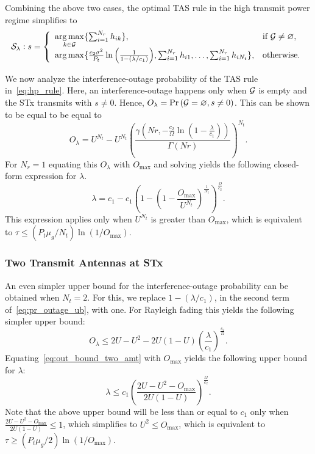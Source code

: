\documentclass[12pt,draftcls,peerreview,onecolumn]{IEEEtran}
\newcommand{\brac}[1]{\left({#1}\right)}
\newcommand{\prob}[1]{\text{Pr}\brac{#1}}
\DeclareMathOperator*{\argmax}{arg\,max}
\newcommand{\nx}{{0}}
\newcommand{\lam}{\lambda}
\newcommand{\mug}{{\mu_{g}}}
\newcommand{\goodset}{\cal{G}}
\newcommand{\Nt}{{N_t}}
\newcommand{\Nr}{{N_r}}
\newcommand{\Pt}{{P_t}}
\newcommand{\such}{h}
\newcommand{\hk}[1]{{\such_{#1}}}
\newcommand{\noisevar}{\sigma^2}
\newcommand{\outmax}{O_{\text{max}}}
\newcommand{\itau}{\tau}
\newcommand{\cone}{c_{1}}
\newcommand{\ctwo}{c_{2}}
\newcommand{\out}{O}
\newcommand{\m}{\cone}
\newcommand{\lambym}{\frac{\lam}{\m}}
\newcommand{\al}{\ctwo}
\newcommand{\snr}{\Omega}
\newcommand{\albysnr}[1][]{\frac{\al#1}{\snr}}
\newcommand{\snrbyal}[1][]{\frac{\snr#1}{\al}}
\newcommand{\un}{U}
\newcommand{\igamma}{{\frac{\al\noisevar}{\Pt}\ln\left(\frac{1}{1-\left(\lam/\m\right) }\right)}}
\newcommand{\callamrule}{{\cal S_{{\lam}}}}
\newcommand{\outlam}{\out_{\lam}}
\newcommand{\nullset}{\varnothing}
\begin{document}
Combining the above two cases, the optimal TAS rule in the high transmit power regime simplifies to
\begin{equation}
\label{eq:hp_rule}
\callamrule: s = \left\{
 \begin{array}{ll}
\argmax\limits_{k\in\goodset}\{\sumnr \hk{ik}\}, & \text{if}~\goodset\neq\nullset, \\
\argmax\{\igamma,\sumnr\hk{i1},\dots,\sumnr\hk{i\Nt}\}, &\text{otherwise}.
\end{array}\right.
\end{equation}

We now analyze the interference-outage probability of the TAS rule in~\eqref{eq:hp_rule}. Here, an interference-outage happens only when $\goodset$ is empty and the STx  transmits with $s\neq\nx$. Hence,  $\outlam=\prob{{\goodset}=\nullset, s \neq 0}$. This can be shown to be equal to be equal to
\begin{equation}
\label{eq:pr_outage_hp}
 \outlam = \un^{\Nt} - \un^{\Nt}\left( \frac{\gamma\left(Nr,-\albysnr[]\ln\left(1-\lambym\right)\right)}{\Gamma\left(Nr\right)}\right)^{\Nt}.
\end{equation}
For $\Nr=1$ equating this $\outlam$ with $\outmax$ and solving yields the following closed-form expression for $\lam$. 
\begin{equation}
\label{eq:lam_asym}
 \lam  =  \m - \m\left(1 - \left(1 - \frac{\outmax}{\un^{\Nt}}\right)^{\frac{1}{\Nt}} \right)^{\snrbyal[]}.
\end{equation}
%
This expression applies only when $\un^{\Nt}$ is greater than $\outmax$, which is equivalent to $\itau\leq\left(\Pt\mug/\Nt\right)\ln\left(1/\outmax\right)$.  

\subsubsection{Two Transmit Antennas at STx} 
An even simpler upper bound for the interference-outage probability can be obtained when $\Nt=2$. For this, we replace $1-\left(\lam/\m\right)$, in the second term of~\eqref{eq:pr_outage_ub}, with one. For Rayleigh fading this yields the following simpler upper bound:
%
\begin{equation}
\outlam \leq  2\un - \un^2-2\un(1-\un)\left(\lambym\right)^{\albysnr[]}.
\label{eq:out_bound_two_amt}
\end{equation}
%
Equating~\eqref{eq:out_bound_two_amt}  with $\outmax$ yields the following upper bound for $\lam$:
\begin{equation}
\label{eq:two_Nt_lam}
\lam \leq \cone \left( \frac{2\un - \un^2 - \outmax}{2\un(1-\un)} \right)^{\snrbyal[]}.
\end{equation} 
Note that the above upper bound will be less than or equal to $\cone$ only when $\frac{2\un - \un^2 - \outmax}{2\un(1-\un)}\leq 1$, which simplifies to $\un^2 \leq \outmax$, which is equivalent to $\itau\geq\left({\Pt\mug}/{2}\right)\ln\left(1/\outmax\right)$.
\end{document}

